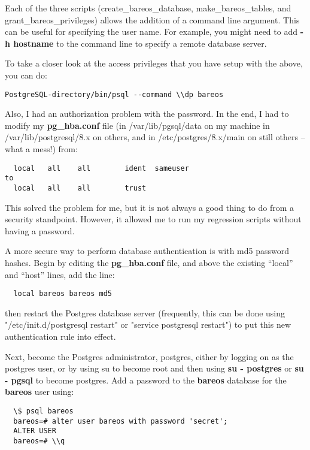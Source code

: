 Each of the three scripts (create\_bareos\_database, make\_bareos\_tables, and
grant\_bareos\_privileges) allows the addition of a command line argument.
This can be useful for specifying the user name. For example, you might need
to add {\bf -h hostname} to the command line to specify a remote database
server.

To take a closer look at the access privileges that you have setup with the
above, you can do:

\footnotesize
\begin{verbatim}
PostgreSQL-directory/bin/psql --command \\dp bareos
\end{verbatim}
\normalsize

Also, I had an authorization problem with the password. In the end,
I had to modify my {\bf pg\_hba.conf} file (in /var/lib/pgsql/data on my machine
in /var/lib/postgresql/8.x on others, and in /etc/postgres/8.x/main on
still others -- what a mess!) from:

\footnotesize
\begin{verbatim}
  local   all    all        ident  sameuser
to
  local   all    all        trust
\end{verbatim}
\normalsize

This solved the problem for me, but it is not always a good thing
to do from a security standpoint.  However, it allowed me to run
my regression scripts without having a password.

A more secure way to perform database authentication is with md5
password hashes.  Begin by editing the {\bf pg\_hba.conf} file, and
above the existing ``local'' and ``host'' lines, add the line:

\footnotesize
\begin{verbatim}
  local bareos bareos md5
\end{verbatim}
\normalsize

then restart the Postgres database server (frequently, this can be done
using "/etc/init.d/postgresql restart" or "service postgresql restart") to
put this new authentication rule into effect.

Next, become the Postgres administrator, postgres, either by logging
on as the postgres user, or by using su to become root and then using
{\bf su - postgres} or {\bf su - pgsql} to become postgres.
Add a password to the {\bf bareos} database for the {\bf bareos} user using:

\footnotesize
\begin{verbatim}
  \$ psql bareos
  bareos=# alter user bareos with password 'secret';
  ALTER USER
  bareos=# \\q
\end{verbatim}
\normalsize

